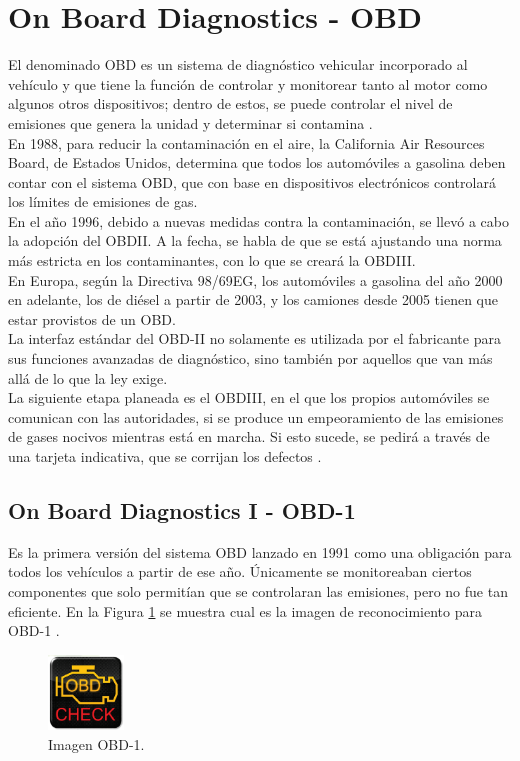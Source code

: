 \documentclass[a4paper,10pt, oneside, titlepage]{article}
\begin{document}
	\section{On Board Diagnostics - OBD}\label{Etiquet_OBD}
	El denominado OBD es un sistema de diagnóstico vehicular incorporado al vehículo y que tiene la función de controlar y monitorear tanto al motor como algunos otros dispositivos; dentro de estos, se puede controlar el nivel de emisiones que genera la unidad y determinar si contamina \cite{CONUEE}. \\\newline
	\indent En 1988, para reducir la contaminación en el aire, la California Air Resources Board, de Estados Unidos, determina que todos los automóviles a gasolina deben contar con el sistema OBD, que con base en dispositivos electrónicos controlará los límites de emisiones de gas. \\\newline
	\indent En el año 1996, debido a nuevas medidas contra la contaminación, se llevó a cabo la adopción del OBDII. A la fecha, se habla de que se está ajustando una norma más estricta en los contaminantes, con lo que se creará la OBDIII. \\\newline
	\indent En Europa, según la Directiva 98/69EG, los automóviles a gasolina del año 2000 en adelante, los de diésel a partir de 2003, y los camiones desde 2005 tienen que estar provistos de un OBD. \\\newline
	\indent La interfaz estándar del OBD-II no solamente es utilizada por el fabricante para sus funciones avanzadas de diagnóstico, sino también por aquellos que van más allá de lo que la ley exige. \\\newline
	\indent La siguiente etapa planeada es el OBDIII, en el que los propios automóviles se comunican con las autoridades, si se produce un empeoramiento de las emisiones de gases nocivos mientras está en marcha. Si esto sucede, se pedirá a través de una  tarjeta indicativa, que se corrijan los defectos \cite{CONUEE}.
	\subsection{On Board Diagnostics I - OBD-1}\label{Etiqueta_Seccion_OBD1}
	Es la primera versión del sistema OBD lanzado en 1991 como una obligación para todos los vehículos a partir de ese año. Únicamente se monitoreaban ciertos componentes que solo permitían que se controlaran las emisiones, pero no fue tan eficiente. En la Figura \ref{Imagen_OBD-1} se muestra cual es la imagen de reconocimiento para OBD-1 \cite{CONUEE}.
	\begin{figure}[!h]
		\centering
		\includegraphics[width = 0.2\linewidth, height = 2cm]{Imagen_OBD-1.png}
		\caption{Imagen OBD-1.}
		\label{Imagen_OBD-1}
	\end{figure}
\end{document}

